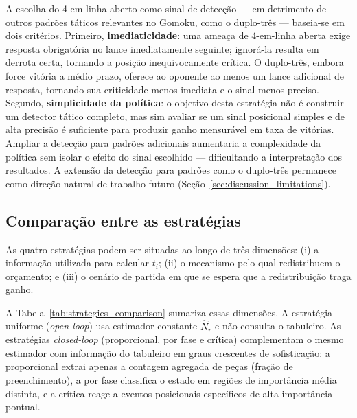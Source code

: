 \documentclass[cic,tc]{iiufrgs}
\begin{document}
A escolha do 4-em-linha aberto como sinal de detecção — em detrimento de outros padrões táticos relevantes no Gomoku, como o duplo-três — baseia-se em dois critérios. Primeiro, \textbf{imediaticidade}: uma ameaça de 4-em-linha aberta exige resposta obrigatória no lance imediatamente seguinte; ignorá-la resulta em derrota certa, tornando a posição inequivocamente crítica. O duplo-três, embora force vitória a médio prazo, oferece ao oponente ao menos um lance adicional de resposta, tornando sua criticidade menos imediata e o sinal menos preciso. Segundo, \textbf{simplicidade da política}: o objetivo desta estratégia não é construir um detector tático completo, mas sim avaliar se um sinal posicional simples e de alta precisão é suficiente para produzir ganho mensurável em taxa de vitórias. Ampliar a detecção para padrões adicionais aumentaria a complexidade da política sem isolar o efeito do sinal escolhido — dificultando a interpretação dos resultados. A extensão da detecção para padrões como o duplo-três permanece como direção natural de trabalho futuro (Seção~\ref{sec:discussion_limitations}).

\subsection{Comparação entre as estratégias}
\label{sec:strategies_comparison}

As quatro estratégias podem ser situadas ao longo de três dimensões: (i) a informação utilizada para calcular $t_i$; (ii) o mecanismo pelo qual redistribuem o orçamento; e (iii) o cenário de partida em que se espera que a redistribuição traga ganho.

A Tabela~\ref{tab:strategies_comparison} sumariza essas dimensões. A estratégia uniforme (\emph{open-loop}) usa estimador constante $\hat{N}_r$ e não consulta o tabuleiro. As estratégias \emph{closed-loop} (proporcional, por fase e crítica) complementam o mesmo estimador com informação do tabuleiro em graus crescentes de sofisticação: a proporcional extrai apenas a contagem agregada de peças (fração de preenchimento), a por fase classifica o estado em regiões de importância média distinta, e a crítica reage a eventos posicionais específicos de alta importância pontual.
\end{document}

